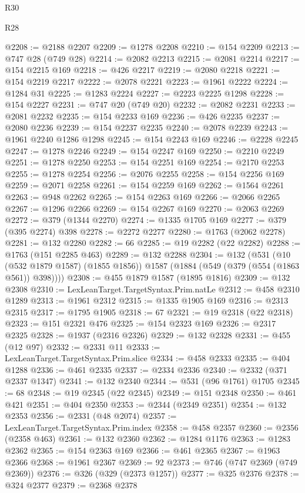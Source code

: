 \begin{lexlean}{R30}
\begin{lexlean}{R28}
\begin{coremodule}
{{{{{{{{{{{{{{{{{{{{{{{{{{{{{{{{{{{{{{{{{{{{{{{{{{{{{{{{{{{{{{{{{{{{{{{{{{{{{{{{{{{{{{{{{{{{{{{{{{{{{{{{{{{{{{{{{{{{{{{{{{{{{{{{{{{{{{{{{{{{{{{@2208 := @2188 @2207
@2209 := @1278 @2208
@2210 := @154 @2209
@2213 := @747 @28 (@749 @28)
@2214 := @2082 @2213
@2215 := @2081 @2214
@2217 := @154 @2215 @169
@2218 := @426 @2217
@2219 := @2080 @2218
@2221 := @154 @2219 @2217
@2222 := @2078 @2221
@2223 := @1961 @2222
@2224 := @1284 @31
@2225 := @1283 @2224
@2227 := @2223 @2225 @1298
@2228 := @154 @2227
@2231 := @747 @20 (@749 @20)
@2232 := @2082 @2231
@2233 := @2081 @2232
@2235 := @154 @2233 @169
@2236 := @426 @2235
@2237 := @2080 @2236
@2239 := @154 @2237 @2235
@2240 := @2078 @2239
@2243 := @1961 @2240 @1286 @1298
@2245 := @154 @2243 @169
@2246 := @2228 @2245
@2247 := @1278 @2246
@2249 := @154 @2247 @169
@2250 := @2210 @2249
@2251 := @1278 @2250
@2253 := @154 @2251 @169
@2254 := @2170 @2253
@2255 := @1278 @2254
@2256 := @2076 @2255
@2258 := @154 @2256 @169
@2259 := @2071 @2258
@2261 := @154 @2259 @169
@2262 := @1564 @2261
@2263 := @948 @2262
@2265 := @154 @2263 @169
@2266 := @2066 @2265
@2267 := @1296 @2266
@2269 := @154 @2267 @169
@2270 := @2063 @2269
@2272 := @379 (@1344 @2270)
@2274 := @1335 @1705 @169
@2277 := @379 (@395 @2274) @398
@2278 := @2272 @2277
@2280 := @1763 (@2062 @2278)
@2281 := @132 @2280
@2282 := 66
@2285 := @19 @2282 (@22 @2282)
@2288 := @1763 (@151 @2285 @463)
@2289 := @132 @2288
@2304 := @132
    (@531
      (@10 (@532 @1879 @1587) (@1855 @1856))
      @1587
      (@1884 (@549 (@379 (@554 (@1863 @561)) @398))))
@2308 := @455 @1879 @1587 (@1895 @1816)
@2309 := @132 @2308
@2310 := LexLeanTarget.TargetSyntax.Prim.natLe
@2312 := @458 @2310 @1289
@2313 := @1961 @2312
@2315 := @1335 @1905 @169
@2316 := @2313 @2315
@2317 := @1795 @1905
@2318 := 67
@2321 := @19 @2318 (@22 @2318)
@2323 := @151 @2321 @476
@2325 := @154 @2323 @169
@2326 := @2317 @2325
@2328 := @1937 (@2316 @2326)
@2329 := @132 @2328
@2331 := @455 (@12 @97)
@2332 := @2331 @11
@2333 := LexLeanTarget.TargetSyntax.Prim.slice
@2334 := @458 @2333
@2335 := @404 @1288
@2336 := @461 @2335
@2337 := @2334 @2336
@2340 := @2332 (@371 @2337 @1347)
@2341 := @132 @2340
@2344 := @531 (@96 @1761) @1705
@2345 := 68
@2348 := @19 @2345 (@22 @2345)
@2349 := @151 @2348
@2350 := @461 @421
@2351 := @404 @2350
@2353 := @2344 (@2349 @2351)
@2354 := @132 @2353
@2356 := @2331 (@48 @2074)
@2357 := LexLeanTarget.TargetSyntax.Prim.index
@2358 := @458 @2357
@2360 := @2356 (@2358 @463)
@2361 := @132 @2360
@2362 := @1284 @1176
@2363 := @1283 @2362
@2365 := @154 @2363 @169
@2366 := @461 @2365
@2367 := @1963 @2366
@2368 := @1961 @2367
@2369 := 92
@2373 := @746 (@747 @2369 (@749 @2369))
@2376 := @326 (@329 (@2373 @1257))
@2377 := @325 @2376
@2378 := @324 @2377
@2379 := @2368 @2378
}}}}}}}}}}}}}}}}}}}}}}}}}}}}}}}}}}}}}}}}}}}}}}}}}}}}}}}}}}}}}}}}}}}}}}}}}}}}}}}}}}}}}}}}}}}}}}}}}}}}}}}}}}}}}}}}}}}}}}}}}}}}}}}}}}}}}}}}}}}}}}}
\end{coremodule}
\end{lexlean}
\end{lexlean}
